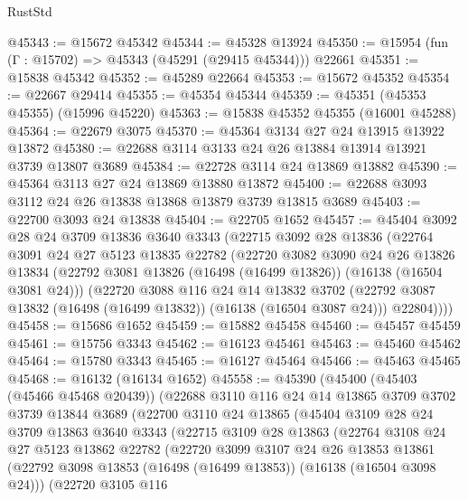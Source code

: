 \begin{lexlean}{RustStd}
\begin{coremodule}
@45343 := @15672 @45342
@45344 := @45328 @13924
@45350 := @15954 (fun (Γ : @15702) => @45343 (@45291 (@29415 @45344))) @22661
@45351 := @15838 @45342
@45352 := @45289 @22664
@45353 := @15672 @45352
@45354 := @22667 @29414
@45355 := @45354 @45344
@45359 := @45351 (@45353 @45355) (@15996 @45220)
@45363 := @15838 @45352 @45355 (@16001 @45288)
@45364 := @22679 @3075
@45370 := @45364 @3134 @27 @24 @13915 @13922 @13872
@45380 := @22688 @3114 @3133 @24 @26 @13884 @13914 @13921 @3739 @13807 @3689
@45384 := @22728 @3114 @24 @13869 @13882
@45390 := @45364 @3113 @27 @24 @13869 @13880 @13872
@45400 := @22688 @3093 @3112 @24 @26 @13838 @13868 @13879 @3739 @13815 @3689
@45403 := @22700 @3093 @24 @13838
@45404 := @22705 @1652
@45457 := @45404
    @3092
    @28
    @24
    @3709
    @13836
    @3640
    @3343
    (@22715
      @3092
      @28
      @13836
      (@22764
        @3091
        @24
        @27
        @5123
        @13835
        @22782
        (@22720
          @3082
          @3090
          @24
          @26
          @13826
          @13834
          (@22792 @3081 @13826 (@16498 (@16499 @13826)) (@16138 (@16504 @3081 @24)))
          (@22720
            @3088
            @116
            @24
            @14
            @13832
            @3702
            (@22792 @3087 @13832 (@16498 (@16499 @13832)) (@16138 (@16504 @3087 @24)))
            @22804))))
@45458 := @15686 @1652
@45459 := @15882 @45458
@45460 := @45457 @45459
@45461 := @15756 @3343
@45462 := @16123 @45461
@45463 := @45460 @45462
@45464 := @15780 @3343
@45465 := @16127 @45464
@45466 := @45463 @45465
@45468 := @16132 (@16134 @1652)
@45558 := @45390
    (@45400
      (@45403 (@45466 @45468 @20439))
      (@22688
        @3110
        @116
        @24
        @14
        @13865
        @3709
        @3702
        @3739
        @13844
        @3689
        (@22700
          @3110
          @24
          @13865
          (@45404
            @3109
            @28
            @24
            @3709
            @13863
            @3640
            @3343
            (@22715
              @3109
              @28
              @13863
              (@22764
                @3108
                @24
                @27
                @5123
                @13862
                @22782
                (@22720
                  @3099
                  @3107
                  @24
                  @26
                  @13853
                  @13861
                  (@22792 @3098 @13853 (@16498 (@16499 @13853)) (@16138 (@16504 @3098 @24)))
                  (@22720
                    @3105
                    @116

\end{coremodule}
\end{lexlean}
